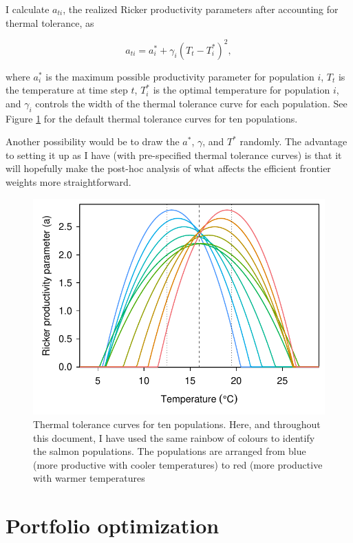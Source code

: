 \documentclass[12pt]{article}
\begin{document}
I calculate $a_{ti}$, the realized Ricker productivity parameters after
accounting for thermal tolerance, as

\begin{equation}
  a_{ti} = a_i^* + \gamma_i (T_t - T_i^*)^2,
\end{equation}

where $a_i^*$ is the maximum possible productivity parameter for
population $i$, $T_t$ is the temperature at time step $t$, $T_i^*$ is
the optimal temperature for population $i$, and $\gamma_i$ controls the
width of the thermal tolerance curve for each population. See Figure
\ref{fig:thermal-curves} for the default thermal tolerance curves for
ten populations.

Another possibility would be to draw the $a^*$, $\gamma$, and $T^*$
randomly. The advantage to setting it up as I have (with pre-specified
thermal tolerance curves) is that it will hopefully make the post-hoc
analysis of what affects the efficient frontier weights more
straightforward.

\begin{figure}[htbp]
\centering
\includegraphics{figure/thermal-curves.pdf}
\caption{Thermal tolerance curves for ten populations. Here, and
throughout this document, I have used the same rainbow of colours to
identify the salmon populations. The populations are arranged from blue
(more productive with cooler temperatures) to red (more productive with
warmer temperatures\label{fig:thermal-curves}}
\end{figure}

\section{Portfolio optimization}
\end{document}
